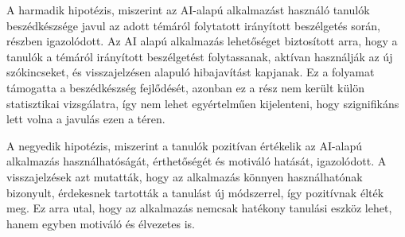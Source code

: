 A harmadik hipotézis, miszerint az AI-alapú alkalmazást használó tanulók beszédkészsége javul az adott témáról folytatott irányított beszélgetés során, részben igazolódott. Az AI alapú alkalmazás lehetőséget biztosított arra, hogy a tanulók a témáról irányított beszélgetést folytassanak, aktívan használják az új szókincseket, és visszajelzésen alapuló hibajavítást kapjanak. Ez a folyamat támogatta a beszédkészség fejlődését, azonban ez a rész nem került külön statisztikai vizsgálatra, így nem lehet egyértelműen kijelenteni, hogy szignifikáns lett volna a javulás ezen a téren.

A negyedik hipotézis, miszerint a tanulók pozitívan értékelik az AI-alapú alkalmazás használhatóságát, érthetőségét és motiváló hatását, igazolódott. A visszajelzések azt mutatták, hogy az alkalmazás könnyen használhatónak bizonyult, érdekesnek tartották a tanulást új módszerrel, így pozitívnak élték meg. Ez arra utal, hogy az alkalmazás nemcsak hatékony tanulási eszköz lehet, hanem egyben motiváló és élvezetes is.

